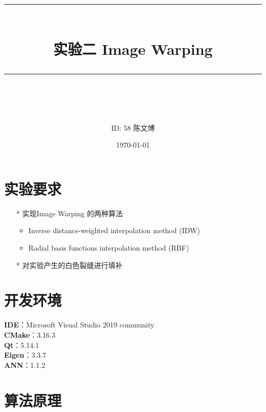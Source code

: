 \documentclass[14pt]{scrartcl} %
\title{	
	\normalfont\normalsize
	\rule{\linewidth}{0.5pt}\\ %
	\vspace{20pt} %
	{\huge 实验二	Image Warping}\\ %
	\vspace{12pt} %
	\rule{\linewidth}{2pt}\\ %
	\vspace{12pt} %
}
\author{\LARGE ID: 58		陈文博} %
\date{\normalsize\today} %
\begin{document}
\maketitle %


\section{实验要求}


\begin{itemize}
	\item[*] 实现Image Warping 的两种算法
	\begin{itemize}
		\item Inverse distance-weighted interpolation method (IDW)
		\item Radial basis functions interpolation method (RBF)
	\end{itemize}
	\item[*] 对实验产生的白色裂缝进行填补
\end{itemize}


\section{开发环境}

\textbf{IDE}：Microsoft Visual Studio 2019 community\\
\textbf{CMake}：3.16.3\\
\textbf{Qt}：5.14.1\\
\textbf{Eigen}：3.3.7\\
\textbf{ANN}：1.1.2


\pagebreak
\section{算法原理}
\end{document}
